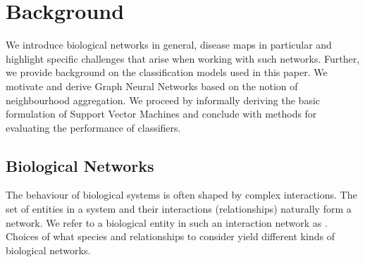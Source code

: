 \documentclass[
	fontsize=10pt, %
	twoside=false, %
	secnumdepth=1, %
  toc=indentunnumbered %
]{kaobook}
\begin{document}




\chapter{Background}
\label{sec:background}
We introduce biological networks in general, disease
maps in particular and highlight specific challenges that arise when working
with such networks. Further, we provide background on the classification models
used in this paper. We motivate and derive Graph Neural Networks based
on the notion of neighbourhood aggregation. We proceed by informally deriving the basic
formulation of Support Vector Machines and conclude with methods for evaluating
the performance of classifiers.


\section{Biological Networks}
\label{biological-networks}

The behaviour of biological systems is often shaped by complex interactions.
%
%
%
The set of entities in a system and their interactions (relationships) naturally
form a network. We refer to a biological entity in such an interaction network
as . Choices of what species and relationships to consider yield
different kinds of biological networks.
\end{document}
